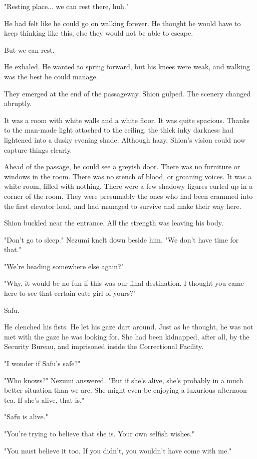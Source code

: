 "Resting place... we can rest there, huh."

He had felt like he could go on walking forever. He thought he would
have to keep thinking like this, else they would not be able to escape.

But we can rest.

He exhaled. He wanted to spring forward, but his knees were weak, and
walking was the best he could manage.

They emerged at the end of the passageway. Shion gulped. The scenery
changed abruptly.

It was a room with white walls and a white floor. It was quite spacious.
Thanks to the man-made light attached to the ceiling, the thick inky
darkness had lightened into a dusky evening shade. Although hazy,
Shion's vision could now capture things clearly.

Ahead of the passage, he could see a greyish door. There was no
furniture or windows in the room. There was no stench of blood, or
groaning voices. It was a white room, filled with nothing. There were a
few shadowy figures curled up in a corner of the room. They were
presumably the ones who had been crammed into the first elevator load,
and had managed to survive and make their way here.

Shion buckled near the entrance. All the strength was leaving his body.

"Don't go to sleep." Nezumi knelt down beside him. "We don't have time
for that."

"We're heading somewhere else again?"

"Why, it would be no fun if this was our final destination. I thought
you came here to see that certain cute girl of yours?"

Safu.

He clenched his fists. He let his gaze dart around. Just as he thought,
he was not met with the gaze he was looking for. She had been kidnapped,
after all, by the Security Bureau, and imprisoned inside the
Correctional Facility.

"I wonder if Safu's safe?"

"Who knows?" Nezumi answered. "But if she's alive, she's probably in a
much better situation than we are. She might even be enjoying a
luxurious afternoon tea. If she's alive, that is."

"Safu is alive."

"You're trying to believe that she is. Your own selfish wishes."

"You must believe it too. If you didn't, you wouldn't have come with
me."

